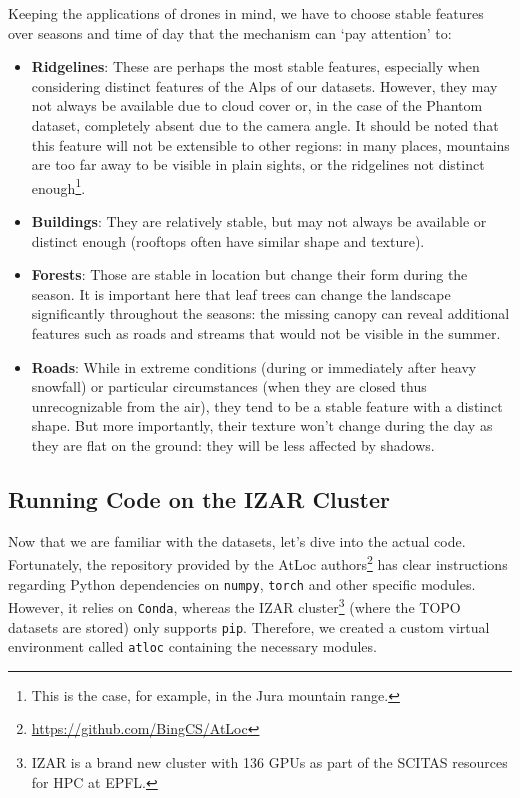 \documentclass[10pt,conference,compsocconf]{IEEEtran}
\begin{document}
Keeping the applications of drones in mind, we have to choose stable features over seasons and time of day that the mechanism can `pay attention' to:
\begin{itemize}
\item \textbf{Ridgelines}: These are perhaps the most stable features, especially when considering distinct features of the Alps of our datasets. However, they may not always be available due to cloud cover or, in the case of the Phantom dataset, completely absent due to the camera angle. It should be noted that this feature will not be extensible to other regions: in many places, mountains are too far away to be visible in plain sights, or the ridgelines not distinct enough\footnote{This is the case, for example, in the Jura mountain range.}.
\item \textbf{Buildings}: They are relatively stable, but may not always be available or distinct enough (rooftops often have similar shape and texture).
\item \textbf{Forests}: Those are stable in location but change their form during the season. It is important here that leaf trees can change the landscape significantly throughout the seasons: the missing canopy can reveal additional features such as roads and streams that would not be visible in the summer.
\item \textbf{Roads}: While in extreme conditions (during or immediately after heavy snowfall) or particular circumstances (when they are closed thus unrecognizable from the air), they tend to be a stable feature with a distinct shape. But more importantly, their texture won't change during the day as they are flat on the ground: they will be less affected by shadows.
\end{itemize}



\subsection{Running Code on the IZAR Cluster}

Now that we are familiar with the datasets, let's dive into the actual code. Fortunately, the repository provided by the AtLoc authors\footnote{\url{https://github.com/BingCS/AtLoc}} has clear instructions regarding Python dependencies on \texttt{numpy}, \texttt{torch} and other specific modules. However, it relies on \texttt{Conda}, whereas the IZAR cluster\footnote{IZAR is a brand new cluster with 136 GPUs as part of the SCITAS resources for HPC at EPFL.} (where the TOPO datasets are stored) only supports \texttt{pip}. Therefore, we created a custom virtual environment called \texttt{atloc} containing the necessary modules.
\end{document}
